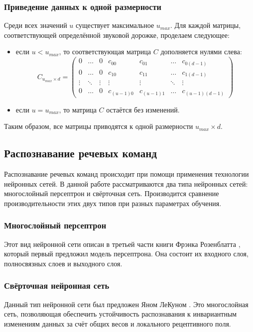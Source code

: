 \subsubsection{Приведение данных к одной размерности}
Среди всех значений $u$ существует максимальное $u_{max}$. Для каждой матрицы, соответствующей определённой звуковой дорожке, проделаем следующее:
\begin{itemize}[leftmargin=2cm]
	\item если $u < u_{max}$, то соответствующая матрица $C$ дополняется нулями слева:
	\begin{equation*}
		C_{u_{max} \times d} = \left(
		\begin{array}{ccccccc}
			0 & \ldots & 0 & c_{00} & c_{01} & \ldots & c_{0(d-1)}\\
			0 & \ldots & 0 & c_{10} &  c_{11} & \ldots & c_{1(d-1)}\\
			\vdots & \ddots & \vdots & \vdots & \vdots & \ddots & \vdots\\
			0 & \ldots & 0 & c_{(u-1)0} & c_{(u-1)1} & \ldots & c_{(u-1)(d-1)}
		\end{array}
		\right)
	\end{equation*}
	\item если $u = u_{max}$, то матрица $C$ остаётся без изменений.
\end{itemize}

Таким образом, все матрицы приводятся к одной размерности $u_{max} \times d$.

\subsection{Распознавание речевых команд}
Распознавание речевых команд происходит при помощи применения технологии нейронных сетей. В данной работе рассматриваются два типа нейронных сетей: многослойный персептрон и свёрточная сеть. Производится сравнение производительности этих двух типов при разных параметрах обучения.
\subsubsection{Многослойный персептрон}
Этот вид нейронной сети описан в третьей части книги Фрэнка Розенблатта \cite{PerceptronBook}, который первый предложил модель персептрона. Она состоит их входного слоя, полносвязных слоев и выходного слоя.
\subsubsection{Свёрточная нейронная сеть}
Данный тип нейронной сети был предложен Яном ЛеКуном \cite{CNN}. Это многослойная сеть, позволяющая обеспечить устойчивость распознавания к инвариантным изменениям данных за счёт общих весов и локального рецептивного поля.

